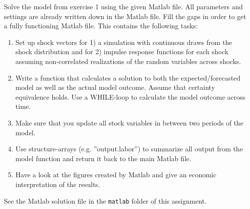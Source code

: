 \documentclass[a4paper, 12pt]{article}
\begin{document}
\begin{Exercise}[title={ADDITIONAL: Solving the model with certainty equivalence},label=ex_2]%
	Solve the model from exercise 1 using the given Matlab file. All parameters and settings are already written down in the Matlab file. Fill the gaps in order to get a fully functioning Matlab file. This contains the following tasks:%
	\begin{enumerate}%
		\item Set up shock vectors for 1) a simulation with continuous draws from the shock distribution and for 2) impulse response functions for each shock assuming non-correlated realizations of the random variables across shocks.%
		\item Write a function that calculates a solution to both the expected/forecasted model as well as the actual model outcome. Assume that certainty equivalence holds. Use a WHILE-loop to calculate the model outcome across time.%
		\item Make sure that you update all stock variables in between two periods of the model.%
		\item Use structure-arrays (e.g. ''output.labor'') to summarize all output from the model function and return it back to the main Matlab file.%
		\item Have a look at the figures created by Matlab and give an economic interpretation of the results.%
	\end{enumerate}%
\end{Exercise}%
\bigskip%
\begin{Answer}%
	See the Matlab solution file in the \texttt{matlab} folder of this assignment.
\end{Answer}%
\bigskip%
\end{document}

